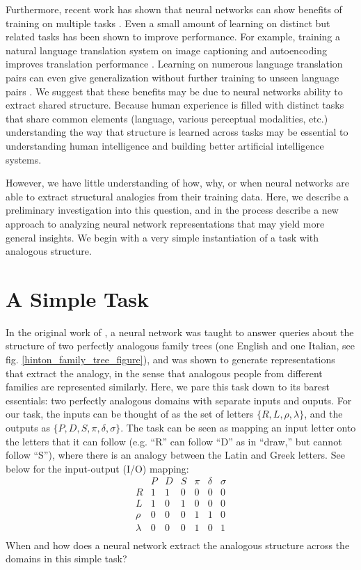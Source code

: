 \documentclass[10pt,letterpaper]{article}
\begin{document}
Furthermore, recent work has shown that neural networks can show benefits of training on multiple tasks \cite[e.g.]{Dong2015,Rusu2015}. Even a small amount of learning on distinct but related tasks has been shown to improve performance. For example, training a natural language translation system on image captioning and autoencoding improves translation performance \citep{Luong2016}. Learning on numerous language translation pairs can even give generalization without further training to unseen language pairs \citep{Johnson2016a}. We suggest that these benefits may be due to neural networks ability to extract shared structure. Because human experience is filled with distinct tasks that share common elements (language, various perceptual modalities, etc.) understanding the way that structure is learned across tasks may be essential to understanding human intelligence and building better artificial intelligence systems.\par
However, we have little understanding of how, why, or when neural networks are able to extract structural analogies from their training data. Here, we describe a preliminary investigation into this question, and in the process describe a new approach to analyzing neural network representations that may yield more general insights. We begin with a very simple instantiation of a task with analogous structure. \par 
\section{A Simple Task}
In the original work of \citet{Hinton1986}, a neural network was taught to answer queries about the structure of two perfectly analogous family trees (one English and one Italian, see fig. \ref{hinton_family_tree_figure}), and was shown to generate representations that extract the analogy, in the sense that analogous people from different families are represented similarly. Here, we pare this task down to its barest essentials: two perfectly analogous domains with separate inputs and ouputs. For our task, the inputs can be thought of as the set of letters \(\{R,L,\rho,\lambda\}\), and the outputs as \(\{P,D,S,\pi,\delta,\sigma\}\). The task can be seen as mapping an input letter onto the letters that it can follow (e.g. ``R'' can follow ``D'' as in ``draw,'' but cannot follow ``S''), where there is an analogy between the Latin and Greek letters. See below for the input-output (I/O) mapping: 
\[
\begin{array}{c|cccccc} 
& P & D & S & \pi & \delta & \sigma \\
\hline
R & 1 & 1 & 0 & 0 & 0 & 0 \\
L & 1 & 0 & 1 & 0 & 0 & 0 \\
\rho & 0 & 0 & 0 & 1 & 1 & 0\\
\lambda & 0 & 0 & 0 & 1 & 0 & 1\\
\end{array} 
\]
When and how does a neural network extract the analogous structure across the domains in this simple task? \par
\end{document}
